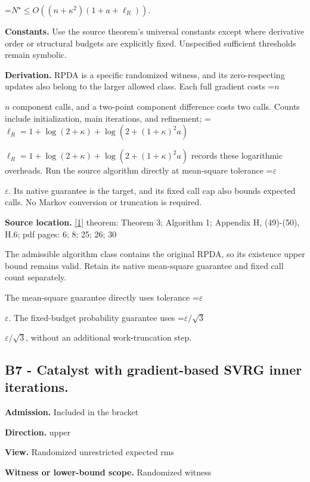 \documentclass[10pt,a4paper]{article}
\newcommand{\AtlasMath}[1]{\par\begingroup\centering\setbox0=\hbox{$\displaystyle #1$}\ifdim\wd0>1.4\linewidth\typeout{ATLAS WIDE FORMULA: \the\wd0}\fi\ifdim\wd0>\linewidth\resizebox{\linewidth}{!}{\box0}\else\box0\fi\par\endgroup}
\newcommand{\AtlasInlineMath}[1]{\begingroup\setbox0=\hbox{$#1$}\ifdim\wd0>.4\linewidth\endgroup\AtlasMath{#1}\else\endgroup$#1$\fi}
\begin{document}
\AtlasMath{N^\star\le O\!\left((n+\kappa^2)(1+a+\ell_R)\right).}


\textbf{Constants.} Use the source theorem’s universal constants except where derivative order or structural budgets are explicitly fixed. Unspecified sufficient thresholds remain symbolic.



\textbf{Derivation.} RPDA is a specific randomized witness, and its zero-respecting updates also belong to the larger allowed class. Each full gradient costs \AtlasInlineMath{n} component calls, and a two-point component difference costs two calls. Counts include initialization, main iterations, and refinement; \AtlasInlineMath{\ell_R=1+\log(2+\kappa)+\log(2+(1+\kappa)^2a)} records these logarithmic overheads. Run the source algorithm directly at mean-square tolerance \AtlasInlineMath{\varepsilon}. Its native guarantee is the target, and its fixed call cap also bounds expected calls. No Markov conversion or truncation is required.



\textbf{Source location.} \href{https://arxiv.org/pdf/2610.04944v1}{[1]} theorem: Theorem 3; Algorithm 1; Appendix H, (49)-(50), H.6; pdf pages: 6; 8; 25; 26; 30



The admissible algorithm class contains the original RPDA, so its existence upper bound remains valid. Retain its native mean-square guarantee and fixed call count separately.



The mean-square guarantee directly uses tolerance \AtlasInlineMath{\varepsilon}. The fixed-budget probability guarantee uses \AtlasInlineMath{\varepsilon/\sqrt3}, without an additional work-truncation step.



\subsection{B7 - Catalyst with gradient-based SVRG inner iterations.}


\textbf{Admission.} Included in the bracket



\textbf{Direction.} upper



\textbf{View.} Randomized unrestricted expected rms



\textbf{Witness or lower-bound scope.} Randomized witness
\end{document}
